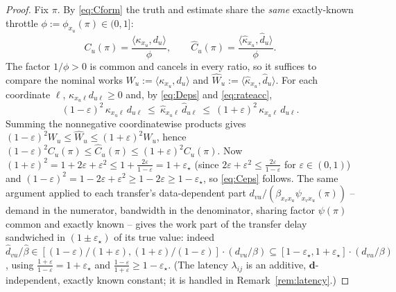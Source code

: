 \documentclass{amsart}
\theoremstyle{definition}
\newcommand{\Chat}{\widehat{C}}
\begin{document}
\begin{proof}
Fix $\pi$. By \eqref{eq:Cform} the truth and estimate share the \emph{same}
exactly-known throttle $\phi:=\phi_{x_u}(\pi)\in(0,1]$:
\[
C_u(\pi)=\frac{\langle\kappa_{x_u},d_u\rangle}{\phi},
\qquad
\Chat_u(\pi)=\frac{\langle\widehat\kappa_{x_u},\widehat d_u\rangle}{\phi}.
\]
The factor $1/\phi>0$ is common and cancels in every ratio, so it suffices to
compare the nominal works $W_u:=\langle\kappa_{x_u},d_u\rangle$ and
$\widehat W_u:=\langle\widehat\kappa_{x_u},\widehat d_u\rangle$. For each
coordinate $\ell$, $\kappa_{x_u\ell}d_{u\ell}\ge0$ and, by \eqref{eq:Deps} and
\eqref{eq:rateacc},
\[
(1-\varepsilon)^2\,\kappa_{x_u\ell}\,d_{u\ell}
\ \le\ \widehat\kappa_{x_u\ell}\,\widehat d_{u\ell}
\ \le\ (1+\varepsilon)^2\,\kappa_{x_u\ell}\,d_{u\ell}.
\]
Summing the nonnegative coordinatewise products gives
$(1-\varepsilon)^2 W_u\le\widehat W_u\le(1+\varepsilon)^2 W_u$, hence
$(1-\varepsilon)^2 C_u(\pi)\le\Chat_u(\pi)\le(1+\varepsilon)^2 C_u(\pi)$. Now
$(1+\varepsilon)^2=1+2\varepsilon+\varepsilon^2\le1+\frac{2\varepsilon}{1-\varepsilon}
=1+\varepsilon_\star$ (since $2\varepsilon+\varepsilon^2\le\frac{2\varepsilon}{1-\varepsilon}$
for $\varepsilon\in(0,1)$) and $(1-\varepsilon)^2=1-2\varepsilon+\varepsilon^2
\ge1-2\varepsilon\ge1-\varepsilon_\star$, so \eqref{eq:Ceps} follows. The same
argument applied to each transfer's data-dependent part
$d_{vu}/(\beta_{x_vx_u}\psi_{x_vx_u}(\pi))$ -- demand in the numerator,
bandwidth in the denominator, sharing factor $\psi(\pi)$ common and exactly
known -- gives the work part of the transfer delay sandwiched in
$(1\pm\varepsilon_\star)$ of its true value: indeed
$\widehat d_{vu}/\widehat\beta\in[(1-\varepsilon)/(1+\varepsilon),
(1+\varepsilon)/(1-\varepsilon)]\cdot(d_{vu}/\beta)\subseteq
[1-\varepsilon_\star,1+\varepsilon_\star]\cdot(d_{vu}/\beta)$, using
$\frac{1+\varepsilon}{1-\varepsilon}=1+\varepsilon_\star$ and
$\frac{1-\varepsilon}{1+\varepsilon}\ge1-\varepsilon_\star$. (The latency
$\lambda_{ij}$ is an additive, $\mathbf d$-independent, exactly known constant;
it is handled in Remark~\ref{rem:latency}.)


\end{proof}
\end{document}

